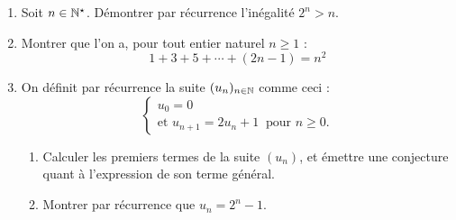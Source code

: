\documentclass[11pt,class=report,crop=false]{standalone}
\begin{document}
\exercice{}
\sauteligne
\begin{enumerate}
    \item Soit $n \in \mathbb{N}^\star$. Démontrer par récurrence l'inégalité $2^n > n$.
    
    \item Montrer que l'on a, pour tout entier naturel $n \ge 1$ :
    $$ 1 + 3 + 5 + \cdots + (2n-1) = n^2 $$
    
    \item On définit par récurrence la suite $(u_n)_{n \in \mathbb{N}}$ comme ceci :
    $$\left\{\begin{array}{l}
    u_0 = 0  \\
    \text{et } u_{n+1} = 2 u_n + 1 \  \text{ pour } n \ge 0.
    \end{array}\right.
    $$
    \begin{enumerate}
        \item Calculer les premiers termes de la suite $(u_n)$, et émettre une conjecture quant à l'expression de son terme général.
        \item Montrer par récurrence que $u_n = 2^n - 1$.
    \end{enumerate}
\end{enumerate}
\finenonce

\noindication
\end{document}
